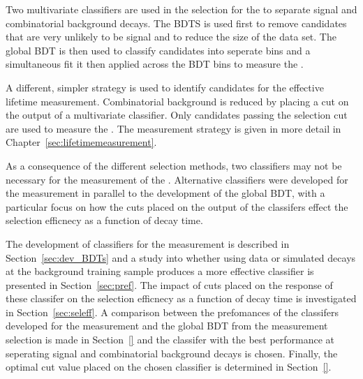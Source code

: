Two multivariate classifiers are used in the selection for the \BFm to separate signal and combinatorial background decays. The BDTS is used first to remove candidates that are very unlikely to be signal and to reduce the size of the data set. The global BDT is then used to classify candidates into seperate bins and a simultaneous fit it then applied across the BDT bins to measure the \BFs.

A different, simpler strategy is used to identify candidates for the \bsmumu effective lifetime measurement. Combinatorial background is reduced by placing a cut on the output of a multivariate classifier. Only candidates passing the selection cut are used to measure the \el. The measurement strategy is given in more detail in Chapter~\ref{sec:lifetimemeasurement}. 

As a consequence of the different selection methods, two classifiers may not be necessary for the measurement of the \el. Alternative classifiers were developed for the \el measurement in parallel to the development of the global BDT, with a particular focus on how the cuts placed on the output of the classifers effect the selection efficnecy as a function of decay time.


The development of classifiers for the \el measurement is described in Section~\ref{sec:dev_BDTs} and a study into whether using data or simulated decays at the background training sample produces a more effective classifier is presented in Section~\ref{sec:pref}. 
The impact of cuts placed on the response of these classifer on the selection efficnecy as a function of decay time is investigated in Section~\ref{sec:seleff}. A comparison between the prefomances of the classifers developed for the \el measurement and the global BDT from the \BF measurement selection is made in Section~\ref{} and the classifer with the best performance at seperating signal and combinatorial background decays is chosen.
Finally, the optimal cut value placed on the chosen classifier is determined in Section~\ref{}.



